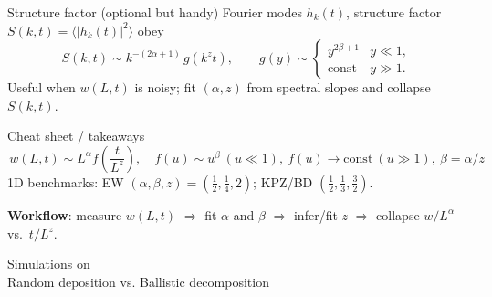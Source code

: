 \documentclass[9pt,table,xcolor=dvipsnames]{beamer}
\begin{document}
\begin{frame}[t]{Structure factor (optional but handy)}
\small
Fourier modes $h_k(t)$, structure factor $S(k,t)=\langle|h_k(t)|^2\rangle$ obey
\[
S(k,t)\sim k^{-(2\alpha+1)}\,g(k^{z}t),\qquad
g(y)\sim\begin{cases}
y^{2\beta+1} & y\ll1,\\
\text{const} & y\gg1.
\end{cases}
\]
Useful when $w(L,t)$ is noisy; fit $(\alpha,z)$ from spectral slopes and collapse $S(k,t)$.
\end{frame}

\begin{frame}[t]{Cheat sheet / takeaways}
\small
\[
\boxed{\,w(L,t)\sim L^{\alpha} f\!\left(\dfrac{t}{L^{z}}\right),\quad
f(u)\sim u^{\beta}\ (u\!\ll\!1),\ f(u)\to\text{const}\ (u\!\gg\!1),\ 
\beta=\alpha/z\,}
\]
1D benchmarks: EW $(\alpha,\beta,z)=(\tfrac12,\tfrac14,2)$; KPZ/BD $(\tfrac12,\tfrac13,\tfrac32)$.
\medskip

\textbf{Workflow}: measure $w(L,t)$ $\Rightarrow$ fit $\alpha$ and $\beta$ $\Rightarrow$ infer/fit $z$ $\Rightarrow$ collapse $w/L^\alpha$ vs.\ $t/L^z$.
\end{frame}
\begin{frame}[fragile] %
  \begin{center}
    \Large Simulations on \\ \bigskip
    Random deposition vs. Ballistic decomposition
  \end{center}
\end{frame}
\end{document}
